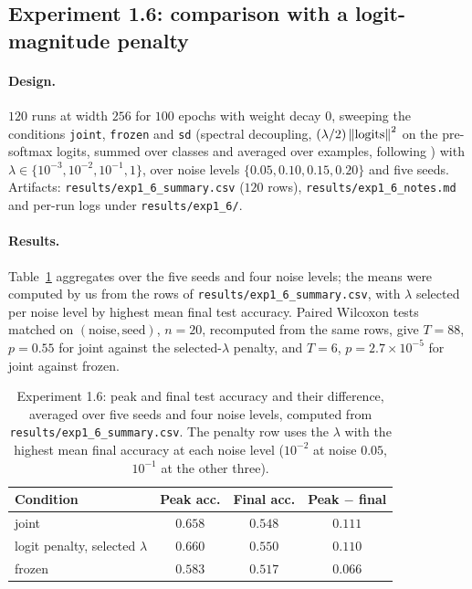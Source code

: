 \subsection{Experiment 1.6: comparison with a logit-magnitude penalty}
\label{app:exp16}

\paragraph{Design.} $120$ runs at width $256$ for $100$ epochs with weight
decay $0$, sweeping the conditions \texttt{joint}, \texttt{frozen} and
\texttt{sd} (spectral decoupling, $(\lambda/2)\left\lVert\text{logits}\right\rVert^2$ on the
pre-softmax logits, summed over classes and averaged over examples, following
\citet{pezeshki2021gradient}) with $\lambda \in \{10^{-3}, 10^{-2}, 10^{-1},
1\}$, over noise levels $\{0.05, 0.10, 0.15, 0.20\}$ and five seeds.
Artifacts: \texttt{results/exp1\_6\_summary.csv} ($120$ rows),
\texttt{results/exp1\_6\_notes.md} and per-run logs under
\texttt{results/exp1\_6/}.

\paragraph{Results.} Table~\ref{tab:app_exp16} aggregates over the five seeds
and four noise levels; the means were computed by us from the rows of
\texttt{results/exp1\_6\_summary.csv}, with $\lambda$ selected per noise level
by highest mean final test accuracy. Paired Wilcoxon tests matched on
$(\text{noise}, \text{seed})$, $n = 20$, recomputed from the same rows, give
$T = 88$, $p = 0.55$ for joint against the selected-$\lambda$ penalty, and
$T = 6$, $p = 2.7\times10^{-5}$ for joint against frozen.

\begin{table}[htbp]
\centering
\caption{Experiment 1.6: peak and final test accuracy and their difference,
averaged over five seeds and four noise levels, computed from
\texttt{results/exp1\_6\_summary.csv}. The penalty row uses the $\lambda$ with
the highest mean final accuracy at each noise level ($10^{-2}$ at noise
$0.05$, $10^{-1}$ at the other three).}
\label{tab:app_exp16}
\begin{tabular}{lccc}
\toprule
Condition & Peak acc. & Final acc. & Peak $-$ final \\
\midrule
joint                       & $0.658$ & $0.548$ & $0.111$ \\
logit penalty, selected $\lambda$ & $0.660$ & $0.550$ & $0.110$ \\
frozen                      & $0.583$ & $0.517$ & $0.066$ \\
\bottomrule
\end{tabular}
\end{table}


